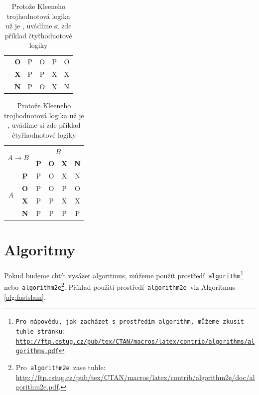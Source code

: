 \documentclass[11pt]{article}
\begin{document}
\begin{table}[h]
\begin{tabular}{|c|c|c|c|c|c|}
                                                          & \textbf{O}               & P          & O          & P          & O \\
        \cline{2-6}
                                                          & \textbf{X}               & P          & P          & X          & X \\
        \cline{2-6}
                                                          & \textbf{N}               & P          & O          & X          & N \\
        \hline
    \end{tabular}
    \begin{tabular}{|c|c|c|c|c|c|}
        \hline
        \multicolumn{2}{|c|}{\multirow{2}{*}{$A \rightarrow B$}} & \multicolumn{4}{c|}{$B$}                                            \\
        \cline{3-6}
        \multicolumn{2}{|c|}{}                                   & \textbf{P}               & \textbf{O} & \textbf{X} & \textbf{N}     \\
        \hline
        \multirow{4}{*}{$A$}                                     & \textbf{P}               & P          & O          & X          & N \\
        \cline{2-6}
                                                                 & \textbf{O}               & P          & O          & P          & O \\
        \cline{2-6}
                                                                 & \textbf{X}               & P          & P          & X          & X \\
        \cline{2-6}
                                                                 & \textbf{N}               & P          & P          & P          & P \\
        \hline
    \end{tabular}

    \caption{Protože Kleeneho trojhodnotová logika už je , uvádíme si zde příklad čtyřhodnotové logiky}
    \label{tab:logic}
\end{table}
\bigskip
\pagebreak

\section{Algoritmy}
\label{sec:algorithms}
Pokud budeme chtít vysázet algoritmus, můžeme použít prostředí\texttt{ algorithm\footnote{Pro nápovědu, jak zacházet s prostředím\texttt{ algorithm,} můžeme zkusit tuhle stránku:\\\url{http://ftp.cstug.cz/pub/tex/CTAN/macros/latex/contrib/algorithms/algorithms.pdf} } }
nebo\texttt{ algorithm2e}\footnote{Pro\texttt{ algorithm2e }zase tuhle: \url{http://ftp.cstug.cz/pub/tex/CTAN/macros/latex/contrib/algorithm2e/doc/algorithm2e.pdf}.}.
Příklad použití prostředí\texttt{ algorithm2e }viz Algoritmus \ref{alg:fastslam}.\\
\end{document}
